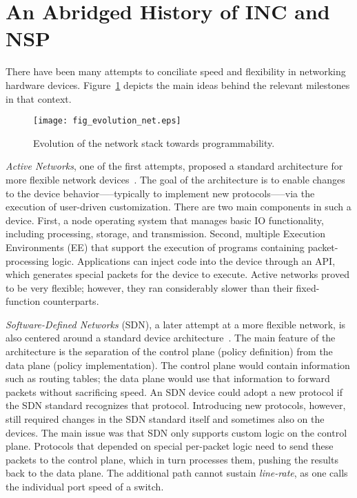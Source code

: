 \documentclass[11pt,dvipdfmx]{article}
\begin{document}
\section{An Abridged History of INC and NSP}
\label{sec:background}

There have been many attempts to conciliate speed and flexibility in
networking hardware devices.
Figure~\ref{fig:evolution_net} depicts the main ideas behind the relevant
milestones in that context.


\begin{figure}[h]
  \centering
  \texttt{[image: fig\_evolution\_net.eps]} %
  \caption{Evolution of the network stack towards programmability.}
  \label{fig:evolution_net}
\end{figure}


\emph{Active Networks}, one of the first attempts, proposed a standard
architecture for more flexible network devices~\cite{calvert98}.
The goal of the architecture is to enable changes to the device
behavior—--typically to implement new protocols—--via the execution of
user-driven customization.
There are two main components in such a device.
First, a node operating system that manages basic IO functionality, including
processing, storage, and transmission.
Second, multiple Execution Environments (EE) that support the execution of
programs containing packet-processing logic.
Applications can inject code into the device through an API, which generates
special packets for the device to execute.
Active networks proved to be very flexible; however, they ran considerably
slower than their fixed-function counterparts.


\emph{Software-Defined Networks} (SDN), a later attempt at a more flexible
network, is also centered around a standard device
architecture~\cite{kreutz15}.
The main feature of the architecture is the separation of the control plane
(policy definition) from the data plane (policy implementation).
The control plane would contain information such as routing tables; the data
plane would use that information to forward packets without sacrificing speed.
An SDN device could adopt a new protocol if the SDN standard recognizes that
protocol.
Introducing new protocols, however, still required changes in the SDN standard
itself and sometimes also on the devices.
The main issue was that SDN only supports custom logic on the control plane.
Protocols that depended on special per-packet logic need to send these packets
to the control plane, which in turn processes them, pushing the results back to
the data plane.
The additional path cannot sustain \emph{line-rate}, as one calls the individual
port speed of a switch.
\end{document}
